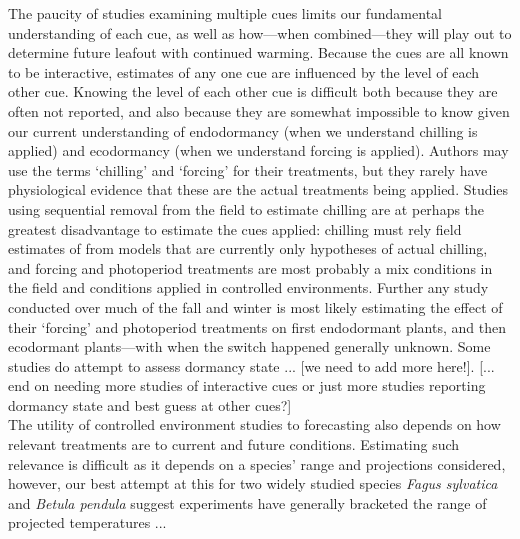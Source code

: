 \documentclass[11pt,letter]{article}
\begin{document}
The paucity of studies examining multiple cues limits our fundamental understanding of each cue, as well as how---when combined---they will play out to determine future leafout with continued warming. Because the cues are all known to be interactive, estimates of any one cue are influenced by the level of each other cue. Knowing the level of each other cue is difficult both because they are often not reported, and also because they are somewhat impossible to know given our current understanding of endodormancy (when we understand chilling is applied) and ecodormancy (when we understand forcing is applied). Authors may use the terms `chilling' and `forcing' for their treatments, but they rarely have physiological evidence that these are the actual treatments being applied. Studies using sequential removal from the field to estimate chilling are at perhaps the greatest disadvantage to estimate the cues applied: chilling must rely field estimates of from models that are currently only hypotheses of actual chilling, and forcing and photoperiod treatments are most probably a mix conditions in the field and conditions applied in controlled environments. Further any study conducted over much of the fall and winter is most likely estimating the effect of their `forcing' and photoperiod treatments on first endodormant plants, and then ecodormant plants---with when the switch happened generally unknown. Some studies do attempt to assess dormancy state ... [we need to add more here!]. [... end on needing more studies of interactive cues or just more studies reporting dormancy state and best guess at other cues?]\\

The utility of controlled environment studies to forecasting also depends on how relevant treatments are to current and future conditions. Estimating such relevance is difficult as it depends on a species' range and projections considered, however, our best attempt at this for two widely studied species \emph{Fagus sylvatica} and \emph{Betula pendula} suggest experiments have generally bracketed the range of projected temperatures ...
\end{document}
